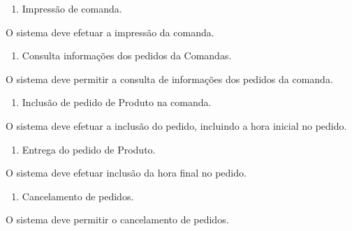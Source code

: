 \liststyleWWNumi
\setcounter{saveenum}{\value{enumi}}
\begin{enumerate}
\setcounter{enumi}{\value{saveenum}}
\item {
\textcolor[rgb]{0.078431375,0.09411765,0.13725491}{Impressão de comanda.}}
\end{enumerate}
{
\textcolor[rgb]{0.078431375,0.09411765,0.13725491}{O sistema deve efetuar a impressão da comanda.}}

\liststyleWWNumi
\setcounter{saveenum}{\value{enumi}}
\begin{enumerate}
\setcounter{enumi}{\value{saveenum}}
\item {
\textcolor[rgb]{0.078431375,0.09411765,0.13725491}{Consulta informações dos pedidos da Comandas.}}
\end{enumerate}
{
\textcolor[rgb]{0.078431375,0.09411765,0.13725491}{O sistema deve permitir a consulta de informações dos pedidos da
comanda.}}


\bigskip


\bigskip

\liststyleWWNumi
\setcounter{saveenum}{\value{enumi}}
\begin{enumerate}
\setcounter{enumi}{\value{saveenum}}
\item {
\textcolor[rgb]{0.078431375,0.09411765,0.13725491}{Inclusão de pedido de Produto na comanda.}}
\end{enumerate}
{
\textcolor[rgb]{0.078431375,0.09411765,0.13725491}{O sistema deve efetuar a inclusão do pedido, incluindo a hora inicial
no pedido.}}

\liststyleWWNumi
\setcounter{saveenum}{\value{enumi}}
\begin{enumerate}
\setcounter{enumi}{\value{saveenum}}
\item {
\textcolor[rgb]{0.078431375,0.09411765,0.13725491}{Entrega do pedido de Produto.}}
\end{enumerate}
{
\textcolor[rgb]{0.078431375,0.09411765,0.13725491}{O sistema deve efetuar inclusão da hora final no pedido.}}

\liststyleWWNumi
\setcounter{saveenum}{\value{enumi}}
\begin{enumerate}
\setcounter{enumi}{\value{saveenum}}
\item {
\textcolor[rgb]{0.078431375,0.09411765,0.13725491}{Cancelamento de pedidos.}}
\end{enumerate}
{
\textcolor[rgb]{0.078431375,0.09411765,0.13725491}{O sistema deve permitir o cancelamento de pedidos.}}

